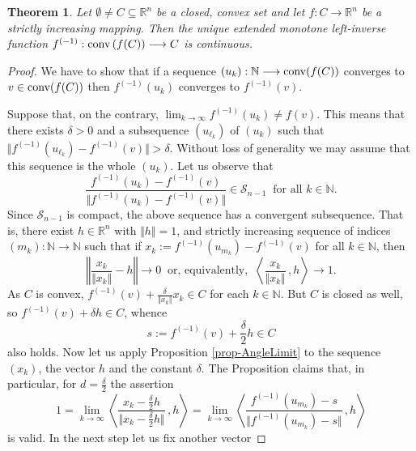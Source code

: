 \documentclass[12pt]{amsart}
\newtheorem{thm}{Theorem}%
\theoremstyle{remark}
\theoremstyle{definition}
\newcommand{\NN}{\mathbb{N}}
\newcommand{\Rn}{\mathbb{R}^n}
\newcommand{\exmo}{extended monotone left-inverse }
\newcommand{\nma}{\Vert}
\newcommand{\conv}{\mbox{\rm conv}}
\newcommand{\map}{\longrightarrow}
\newcommand{\bsz}[2]{\left \langle #1 \,, #2 \right \rangle}
\begin{document}
\begin{thm}\label{thm-ExmoContinuous}
Let $ \emptyset \neq C \subseteq \Rn $ be a closed, 
convex set and let $ f : C \map \Rn $ be 
a strictly increasing mapping. Then the unique 
\exmo function 
$ f^{(-1)} : \conv \left( f(C) \right) \map C $ is 
continuous. 
\end{thm}

\begin{proof}
We have to show that if a sequence 
$ \left( u_k \right) : \NN \map \conv (f(C)) $ 
converges to $ v \in \conv (f(C)) $ then 
$ f^{(-1)}(u_k) $ converges to $ f^{(-1)} (v) $. 

Suppose that, on the contrary, 
$ \lim_{k \to \infty} f^{(-1)}(u_k) \neq f (v) $. 
This means that there exists $ \delta > 0 $ 
and a subsequence $ \left( u_{\ell_k} \right) $ of 
$ (u_k) $ such that 
$ \nma f^{(-1)} \left( u_{\ell_k} \right) 
- f^{(-1)}  \left( v \right) \nma > \delta $. 
Without loss of generality we may assume that this 
sequence is the whole $ \left( u_k \right) $. 
Let us observe that 
\[
\frac{f^{(-1)}\left( u_k \right) - 
f^{(-1)}\left( v \right)}{\nma f^{(-1)}\left( u_k \right) - 
f^{(-1)}\left( v \right) \nma} 
\in \mathcal{S}_{n-1} 
\ \mbox{ for all } k \in \NN. 
\]
Since $ \mathcal{S}_{n-1} $ is compact, the above sequence 
has a convergent subsequence. 
That is, there exist $ h \in \Rn $ with 
$ \nma h \nma = 1 $, and strictly 
increasing sequence of indices 
$ (m_k) : \NN \map \NN $ such that if 
$ x_k := 
f^{(-1)}\left( u_{m_k} \right) - 
f^{(-1)}\left( v \right) $ 
for all $ k \in \NN $, then 
\[ 
\left\nma \frac{x_k}{\nma x_k \nma} - h \right\nma 
\to 0 
\ \mbox{ or, equivalently, } \ 
\bsz{\frac{x_k}{\nma x_k \nma}}{h} \to 1 . 
\]
As $ C $ is convex, $ f^{(-1)}(v) + 
\frac{\delta}{\nma x_k \nma} x_k  \in C $ for 
each $ k \in \NN $. But $ C $ is closed as well, so 
$ f^{(-1)}(v) + \delta h \in C $, whence 
\[ 
s := f^{(-1)}(v) + \frac{\delta}{2} h \in C 
\] also holds. 
Now let us apply Proposition \ref{prop-AngleLimit} 
to the sequence $ (x_k) $, the vector $ h $ and 
the constant $ \delta $. The Proposition claims that, 
in particular, for $ d=\frac{\delta}{2} $ the assertion 
\begin{equation}\label{eq-thm_Cont1}
1 = \lim_{k \to \infty} 
\bsz{\frac{x_k-\frac{\delta}{2}h}{
\nma x_k - \frac{\delta}{2}h \nma}}{h} 
= 
\lim_{k \to \infty} 
\bsz{\frac{ f^{(-1)}\left( u_{m_k} \right) - s}{
\nma f^{(-1)}\left( u_{m_k} \right) - s \nma}}{h} 
\end{equation} 
is valid. 
In the next step let us fix another vector 

\end{proof}
\end{document}
